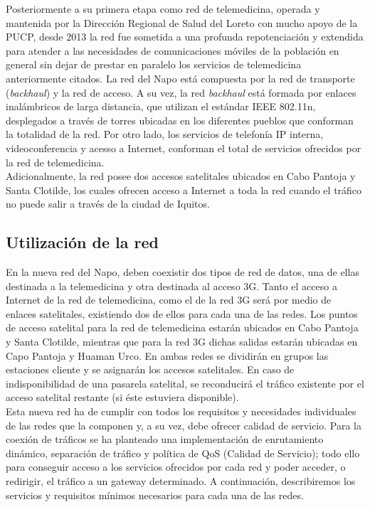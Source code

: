 	 Posteriormente a su primera etapa como red de telemedicina, operada y mantenida por la Dirección Regional de Salud del Loreto con mucho apoyo de la PUCP, desde 2013 la red fue sometida a una profunda repotenciación y extendida para atender a las necesidades de comunicaciones móviles de la población en general sin dejar de prestar en paralelo los servicios de telemedicina anteriormente citados. La red del Napo está compuesta por la red de transporte (\textit{backhaul}) y la red de acceso. A su vez, la red \textit{backhaul} está formada por enlaces inalámbricos de larga distancia, que utilizan el estándar IEEE 802.11n, desplegados a través de torres ubicadas en los diferentes pueblos que conforman la totalidad de la red. Por otro lado, los servicios de telefonía IP interna, videoconferencia y acesso a Internet,  conforman el total de servicios ofrecidos por la red de telemedicina.\\
	Adicionalmente, la red posee dos accesos satelitales ubicados en Cabo Pantoja y Santa Clotilde, los cuales ofrecen acceso a Internet a toda la red cuando el tráfico no puede salir a través de la ciudad de Iquitos.
	
	\subsection{Utilización de la red}
	En la nueva red del Napo, deben coexistir dos tipos de red de datos, una de ellas destinada a la telemedicina y otra destinada al acceso 3G. Tanto el acceso a Internet de la red de telemedicina, como el de la red 3G será por medio de enlaces satelitales, existiendo dos de ellos para cada una de las redes. Los puntos de acceso satelital para la red de telemedicina estarán ubicados en Cabo Pantoja y Santa Clotilde, mientras que para la red 3G dichas salidas estarán ubicadas en Capo Pantoja y Huaman Urco. En ambas redes se dividirán en grupos las estaciones cliente y se asignarán los accesos satelitales. En caso de indisponibilidad de una pasarela satelital, se reconducirá el tráfico existente por el acceso satelital restante (si éste estuviera disponible).\\
	
	Esta nueva red ha de cumplir con todos los requisitos y necesidades individuales de las redes que la componen y, a su vez, debe ofrecer calidad de servicio. Para la coexión de tráficos se ha planteado una implementación de enrutamiento dinámico, separación de tráfico y política de QoS (Calidad de Servicio); todo ello para conseguir acceso a los servicios ofrecidos por cada red y poder acceder, o redirigir, el tráfico a un gateway determinado. A continuación, describiremos los servicios y requisitos mínimos necesarios para cada una de las redes.\\
	
